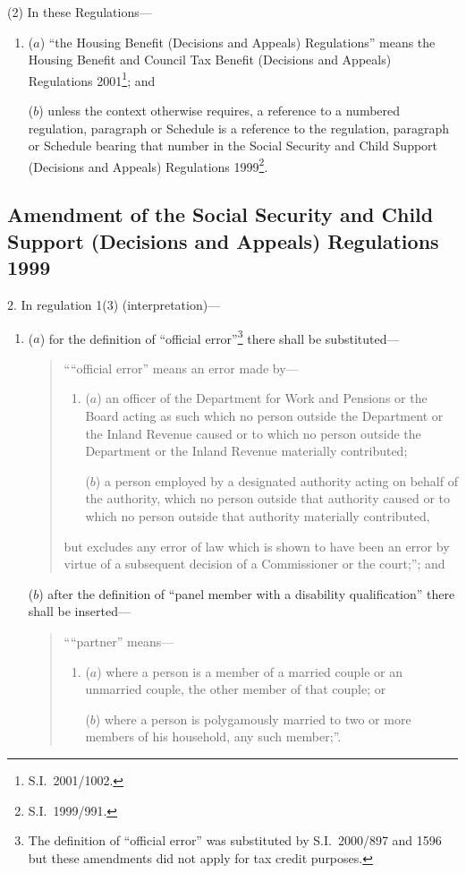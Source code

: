 \documentclass[12pt,a4paper]{article}
\begin{document}
(2) In these Regulations—
\begin{enumerate}\item[]
($a$) “the Housing Benefit (Decisions and Appeals) Regulations” means the Housing Benefit and Council Tax Benefit (Decisions and Appeals) Regulations 2001\footnote{S.I.\ 2001/1002.}; and

($b$) unless the context otherwise requires, a reference to a numbered regulation, paragraph or Schedule is a reference to the regulation, paragraph or Schedule bearing that number in the Social Security and Child Support (Decisions and Appeals) Regulations 1999\footnote{S.I.\ 1999/991.}.
\end{enumerate}

\subsection[2--22.  Amendment of the Social Security and Child Support (Decisions and Appeals) Regulations 1999]{Amendment of the Social Security and Child Support (Decisions and Appeals) Regulations 1999}

2.  In regulation 1(3) (interpretation)—
\begin{enumerate}\item[]
($a$) for the definition of “official error”\footnote{The definition of “official error” was substituted by S.I.\ 2000/897 and 1596 but these amendments did not apply for tax credit purposes.} there shall be substituted—
\begin{quotation}
    ““official error” means an error made by—
\begin{enumerate}\item[]
    ($a$) 
    an officer of the Department for Work and Pensions or the Board acting as such which no person outside the Department or the Inland Revenue caused or to which no person outside the Department or the Inland Revenue materially contributed;
 
   ($b$) 
    a person employed by a designated authority acting on behalf of the authority, which no person outside that authority caused or to which no person outside that authority materially contributed,
\end{enumerate}
    but excludes any error of law which is shown to have been an error by virtue of a subsequent decision of a Commissioner or the court;”; and 
\end{quotation}

($b$) after the definition of “panel member with a disability qualification” there shall be inserted—
\begin{quotation}
    ““partner” means—
\begin{enumerate}\item[]
    ($a$) 
    where a person is a member of a married couple or an unmarried couple, the other member of that couple; or

    ($b$) 
    where a person is polygamously married to two or more members of his household, any such member;”. 
\end{enumerate}
\end{quotation}
\end{enumerate}
\end{document}
